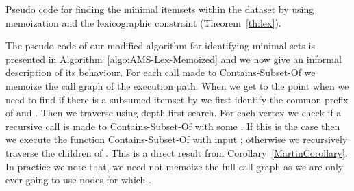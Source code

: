 \documentclass[13pt,a4paper]{article}
\begin{document}
\begin{algorithm} [t]
\SetAlgoNoLine
{}
\func{\amsLex{}}
{
	
	\nl \;
	
	\nl \;
	
	\nl \For{ \KwTo }
	{
		\nl \If{}
		{
			\nl \;
		}
		\Else
		{
			\nl \;
		}
	}
	
	\nl \;
	\nl \;
	\nl \For{ \KwTo }
	{
		\nl \If{}
		{
			
			\nl \If{}
			{
				\nl \;
				
				\nl \If{}
				{
					
					\nl \;
				}
			}
			\Else
			{
				\nl \;
				
				\nl \If{}
				{
					\nl \;
				}
			}
			
			\nl \;
		}
	}
	
	\nl \KwRet   \;
}
\caption{Pseudo code for finding the minimal itemsets within the dataset  by using memoization and the lexicographic constraint (Theorem~\ref{th:lex}).}
\label{algo:AMS-Lex-Memoized}
\end{algorithm}

The pseudo code of our modified algorithm for identifying minimal sets is presented in Algorithm~\ref{algo:AMS-Lex-Memoized} and we now give an informal description of its behaviour. 
For each call made to Contains-Subset-Of we memoize the call graph  of the execution path.
When we get to the point when we need to find if there is a subsumed itemset by  we first identify the common prefix  of  and .
Then we traverse  using depth first search. For each vertex  we check if a recursive call is made to Contains-Subset-Of with some .
If this is the case then we execute the function Contains-Subset-Of with input ; otherwise we recursively traverse the children of . This is a direct result from Corollary~\ref{MartinCorollary}. In practice we note that, we need not memoize the full call graph  as we are only ever going to use nodes  for which .
\end{document}
